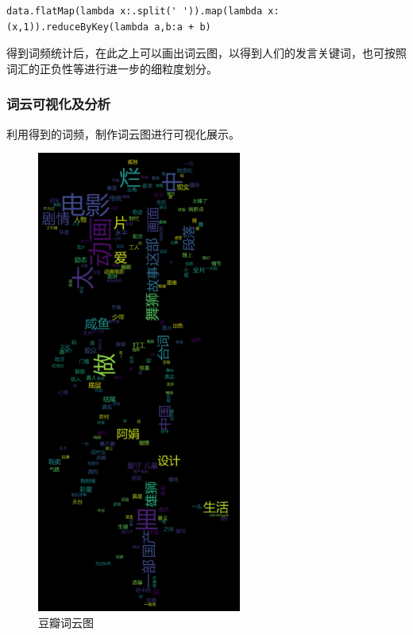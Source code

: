 \documentclass[12pt,a4paper,utf8]{article}
\begin{document}
\begin{verbatim} 
data.flatMap(lambda x:.split(' ')).map(lambda x:(x,1)).reduceByKey(lambda a,b:a + b)
\end{verbatim}   

得到词频统计后，在此之上可以画出词云图，以得到人们的发言关键词，也可按照词汇的正负性等进行进一步的细粒度划分。 \\

\subsubsection{词云可视化及分析}
利用得到的词频，制作词云图进行可视化展示。
\begin{figure}[H]
\centering
\subfigure 
{  
    \begin{minipage}[b]{.45\textwidth}
        \centering 
        \caption{豆瓣词云图}
        \includegraphics[width=0.6\textwidth]{images/douban.png}

\end{minipage}}
\end{figure}
\end{document}
